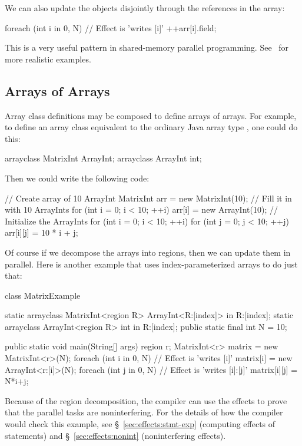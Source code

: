 We can also update the objects disjointly through the references in
the array:
%
\begin{dpjlisting}
foreach (int i in 0, N) {
  // Effect is 'writes [i]'
  ++arr[i].field;
}
\end{dpjlisting}
%
This is a very useful pattern in shared-memory parallel programming.
See \tutorial\ for more realistic examples.


\subsection{Arrays of Arrays}

Array class definitions may be composed to define arrays of arrays.
For example, to define an array class equivalent to the ordinary Java
array type , one could do this:
%
\begin{dpjlisting}
arrayclass MatrixInt {
  ArrayInt;
}
arrayclass ArrayInt {
  int;
}
\end{dpjlisting}
%
Then we could write the following code:
%
\begin{dpjlisting}
// Create array of 10 ArrayInt
MatrixInt arr = new MatrixInt(10);
// Fill it in with 10 ArrayInts
for (int i = 0; i < 10; ++i)
  arr[i] = new ArrayInt(10);
// Initialize the ArrayInts
for (int i = 0; i < 10; ++i)
  for (int j = 0; j < 10; ++j)
    arr[i][j] = 10 * i + j;
\end{dpjlisting}

Of course if we decompose the arrays into regions, then we can update
them in parallel.  Here is another example that uses
index-parameterized arrays to do just that:
%
\begin{dpjlisting}
class MatrixExample {
  static arrayclass MatrixInt<region R> {
    ArrayInt<R:[index]> in R:[index];
  }
  static arrayclass ArrayInt<region R> {
    int in R:[index];
  }
  public static final int N = 10;

  public static void main(String[] args) {
    region r;
    MatrixInt<r> matrix = new MatrixInt<r>(N);
    foreach (int i in 0, N) {
      // Effect is 'writes [i]'
      matrix[i] = new ArrayInt<r:[i]>(N);
      foreach (int j in 0, N) {
        // Effect is 'writes [i]:[j]'
        matrix[i][j] = N*i+j;
      }
    }
  }
}
\end{dpjlisting}
%
Because of the region decomposition, the compiler can use the effects
to prove that the parallel tasks are noninterfering.  For the details
of how the compiler would check this example, see
\S~\ref{sec:effects:stmt-exp} (computing effects of statements) and
\S~\ref{sec:effects:nonint} (noninterfering effects).

